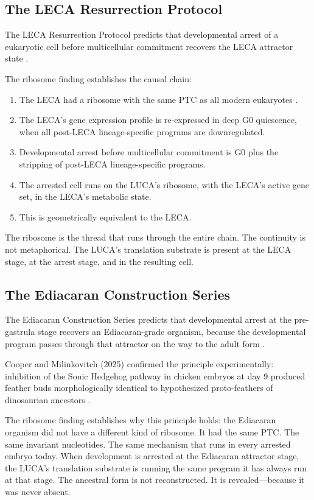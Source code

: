 \documentclass[11pt]{article}
\theoremstyle{definition}
\begin{document}
\subsection{The LECA Resurrection Protocol}

The LECA Resurrection Protocol predicts that developmental arrest
of a eukaryotic cell before multicellular commitment recovers
the LECA attractor state \cite{OrganismCoreLECA}.

The ribosome finding establishes the causal chain:

\begin{enumerate}
    \item The LECA had a ribosome with the same PTC as all
    modern eukaryotes \cite{Richards2024}.
    \item The LECA's gene expression profile is re-expressed
    in deep G0 quiescence, when all post-LECA lineage-specific
    programs are downregulated.
    \item Developmental arrest before multicellular commitment
    is G0 plus the stripping of post-LECA lineage-specific
    programs.
    \item The arrested cell runs on the LUCA's ribosome, with
    the LECA's active gene set, in the LECA's metabolic state.
    \item This is geometrically equivalent to the LECA.
\end{enumerate}

The ribosome is the thread that runs through the entire chain.
The continuity is not metaphorical.
The LUCA's translation substrate is present at the LECA stage,
at the arrest stage, and in the resulting cell.

\subsection{The Ediacaran Construction Series}

The Ediacaran Construction Series predicts that developmental
arrest at the pre-gastrula stage recovers an Ediacaran-grade
organism, because the developmental program passes through
that attractor on the way to the adult form \cite{OrganismCoreEdiacaran}.

Cooper and Milinkovitch (2025) confirmed the principle
experimentally: inhibition of the Sonic Hedgehog pathway in
chicken embryos at day 9 produced feather buds morphologically
identical to hypothesized proto-feathers of dinosaurian ancestors
\cite{Cooper2025}.

The ribosome finding establishes why this principle holds:
the Ediacaran organism did not have a different kind of ribosome.
It had the same PTC.
The same invariant nucleotides.
The same mechanism that runs in every arrested embryo today.
When development is arrested at the Ediacaran attractor stage,
the LUCA's translation substrate is running the same program it
has always run at that stage.
The ancestral form is not reconstructed.
It is revealed---because it was never absent.
\end{document}
